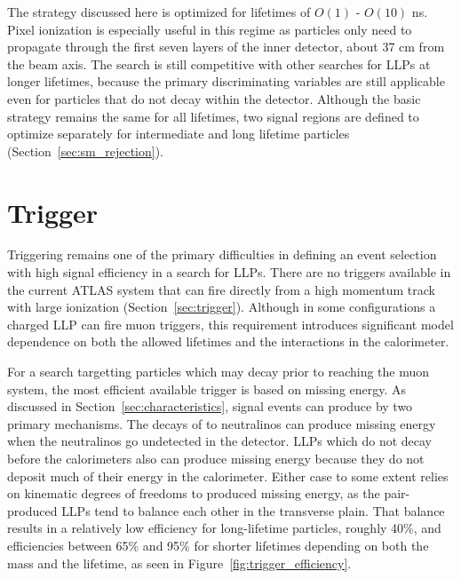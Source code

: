 The strategy discussed here is optimized for lifetimes of $O(1)$ - $O(10)$ ns. 
Pixel ionization is especially useful in this regime as particles only need to propagate through the first seven layers of the inner detector, about 37 cm from the beam axis. 
The search is still competitive with other searches for \acp{LLP} at longer lifetimes, because the primary discriminating variables are still applicable even for particles that do not decay within the detector. 
Although the basic strategy remains the same for all lifetimes, two signal regions are defined to optimize separately for intermediate and long lifetime particles (Section~\ref{sec:sm_rejection}). 



\section{Trigger}

Triggering remains one of the primary difficulties in defining an event selection with high signal efficiency in a search for \acp{LLP}. 
There are no triggers available in the current ATLAS system that can fire directly from a high momentum track with large ionization (Section~\ref{sec:trigger}). 
Although in some configurations a charged \ac{LLP} can fire muon triggers, this requirement introduces significant model dependence on both the allowed lifetimes and the interactions in the calorimeter.

For a search targetting particles which may decay prior to reaching the muon system, the most efficient available trigger is based on missing energy.
As discussed in Section~\ref{sec:characteristics}, signal events can produce \met by two primary mechanisms.
The decays of \rhadrons to neutralinos can produce missing energy when the neutralinos go undetected in the detector.
\acp{LLP} which do not decay before the calorimeters also can produce missing energy because they do not deposit much of their energy in the calorimeter. 
Either case to some extent relies on kinematic degrees of freedoms to produced missing energy, as the pair-produced \acp{LLP} tend to balance each other in the transverse plain.
That balance results in a relatively low efficiency for long-lifetime particles, roughly 40\%, and efficiencies between 65\% and 95\% for shorter lifetimes depending on both the mass and the lifetime, as seen in Figure~\ref{fig:trigger_efficiency}. 


